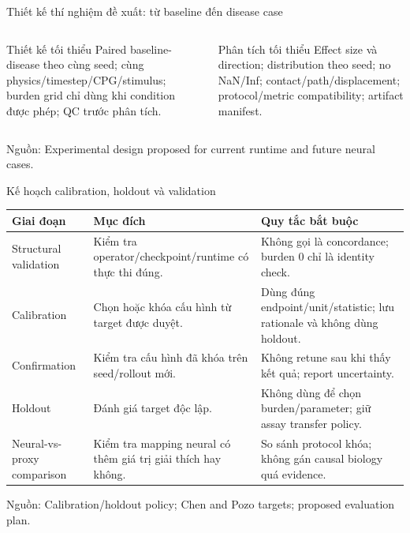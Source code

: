 \documentclass[10pt,aspectratio=169]{beamer}
\newcommand{\source}[1]{\par\vfill{\fontsize{6.0}{7}\selectfont\color{gray}Nguồn: #1\par}}
\newcommand{\smallgap}{\vspace{0.18cm}}
\begin{document}
\begin{frame}{Thiết kế thí nghiệm đề xuất: từ baseline đến disease case}
\centering
{}
\smallgap
\begin{columns}[T,onlytextwidth]
\begin{block}{Thiết kế tối thiểu}
Paired baseline-disease theo cùng seed; cùng physics/timestep/CPG/stimulus; burden grid chỉ dùng khi condition được phép; QC trước phân tích.
\end{block}
\begin{block}{Phân tích tối thiểu}
Effect size và direction; distribution theo seed; no NaN/Inf; contact/path/displacement; protocol/metric compatibility; artifact manifest.
\end{block}
\end{columns}
\source{Experimental design proposed for current runtime and future neural cases.}
\end{frame}

\begin{frame}{Kế hoạch calibration, holdout và validation}
\renewcommand{\arraystretch}{1.10}\scriptsize
\begin{tabular}{@{}L{2.6cm}L{5.3cm}L{5.8cm}@{}}
\toprule
\textbf{Giai đoạn} & \textbf{Mục đích} & \textbf{Quy tắc bắt buộc}\\\midrule
Structural validation & Kiểm tra operator/checkpoint/runtime có thực thi đúng. & Không gọi là concordance; burden 0 chỉ là identity check.\\
Calibration & Chọn hoặc khóa cấu hình từ target được duyệt. & Dùng đúng endpoint/unit/statistic; lưu rationale và không dùng holdout.\\
Confirmation & Kiểm tra cấu hình đã khóa trên seed/rollout mới. & Không retune sau khi thấy kết quả; report uncertainty.\\
Holdout & Đánh giá target độc lập. & Không dùng để chọn burden/parameter; giữ assay transfer policy.\\
Neural-vs-proxy comparison & Kiểm tra mapping neural có thêm giá trị giải thích hay không. & So sánh protocol khóa; không gán causal biology quá evidence.\\\bottomrule
\end{tabular}
\source{Calibration/holdout policy; Chen and Pozo targets; proposed evaluation plan.}
\end{frame}
\end{document}
